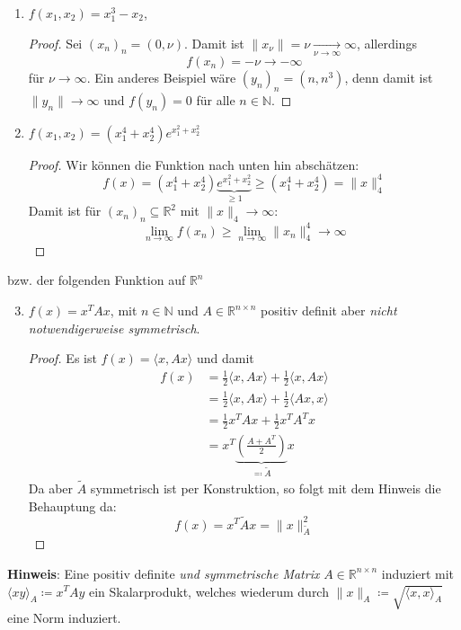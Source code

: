 \documentclass[12pt]{extreport} %
\newcommand{\N}{\mathbb{N}}
\newcommand{\R}{\mathbb{R}}
\theoremstyle{named}
\theoremstyle{nnamed}
\theoremstyle{itshape}
\theoremstyle{normal}
\begin{document}
\begin{enumerate}
	\item $f(x_1, x_2) = x_1^3 - x_2$,
		\begin{proof}
			Sei $(x_n)_n = (0, \nu)$. Damit ist $\| x_\nu \| = \nu \xrightarrow[\nu \rightarrow \infty]{} \infty$, allerdings
			$$ f(x_n) = - \nu \rightarrow - \infty $$
			für $\nu \rightarrow \infty$. Ein anderes Beispiel wäre $(y_n)_n = (n, n^3)$, denn damit ist $\| y_n \| \rightarrow \infty$ und $f(y_n) = 0$ für alle $n \in \N$.
		\end{proof}
	\item $f(x_1, x_2) = \left(x_1^4 + x_2^4 \right) e^{x_1^2 + x_2^2}$
		\begin{proof}
			Wir können die Funktion nach unten hin abschätzen:
			$$ f(x) = \left( x_1^4 + x_2^4 \right) \underbrace{e^{x_1^2 + x_2^2}}_{\geq 1} \geq \left( x_1^4 + x_2^4 \right) = \| x \|_4^4 $$
			Damit ist für $(x_n)_n \subseteq \R^2$ mit $\| x \|_4 \rightarrow \infty$:
			$$ \lim_{n \rightarrow \infty} f(x_n) \geq \lim_{n \rightarrow \infty} \| x_n \|_4^4 \rightarrow \infty $$
		\end{proof}
\end{enumerate}
bzw. der folgenden Funktion auf $\R^n$
\begin{enumerate}   \setcounter{enumi}{2}
	\item $f(x) = x^T A x$, mit $n \in \N$ und $A \in \R^{n\times n}$ positiv definit aber \textit{nicht notwendigerweise symmetrisch}.
		\begin{proof}
			Es ist $f(x) = \langle x, Ax \rangle$ und damit
			\begin{align*}
				f(x) & = \frac{1}{2} \langle x, Ax \rangle + \frac{1}{2} \langle   x, A x \rangle \\
					 & = \frac{1}{2} \langle x, Ax \rangle + \frac{1}{2} \langle A x, x   \rangle \\
					 & = \frac{1}{2} x^T A x + \frac{1}{2} x^T A^T x \\
					 & = x^T \underbrace{\left( \frac{A + A^T}{2} \right)}_{\eqqcolon \tilde{A}} x
			\end{align*}
			Da aber $\tilde{A}$ symmetrisch ist per Konstruktion, so folgt mit dem Hinweis die Behauptung da:
			$$ f(x) = x^T \tilde{A} x = \| x \|_{\tilde{A}}^2 $$
		\end{proof}
\end{enumerate}

\textbf{Hinweis}: Eine positiv definite \textit{und symmetrische Matrix} $A \in \R^{n \times n}$ induziert mit $\langle x y \rangle_A \coloneqq x^TAy$ ein Skalarprodukt, welches wiederum durch $\| x \|_A \coloneqq \sqrt{\langle x, x \rangle_A}$ eine Norm induziert.
\end{document}
